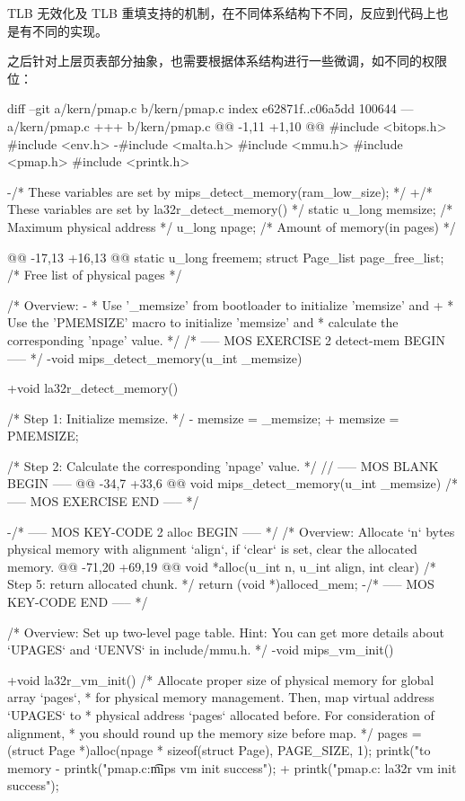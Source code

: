 TLB 无效化及 TLB 重填支持的机制，在不同体系结构下不同，反应到代码上也是有不同的实现。

之后针对上层页表部分抽象，也需要根据体系结构进行一些微调，如不同的权限位：

\begin{CodeBlock}[language=BookDiff]
diff --git a/kern/pmap.c b/kern/pmap.c
index e62871f..c06a5dd 100644
--- a/kern/pmap.c
+++ b/kern/pmap.c
@@ -1,11 +1,10 @@
 #include <bitops.h>
 #include <env.h>
-#include <malta.h>
 #include <mmu.h>
 #include <pmap.h>
 #include <printk.h>
 
-/* These variables are set by mips_detect_memory(ram_low_size); */
+/* These variables are set by la32r_detect_memory() */
 static u_long memsize; /* Maximum physical address */
 u_long npage;         /* Amount of memory(in pages) */
 
@@ -17,13 +16,13 @@ static u_long freemem;
 struct Page_list page_free_list; /* Free list of physical pages */
 
 /* Overview:
- *   Use '_memsize' from bootloader to initialize 'memsize' and
+ *   Use the 'PMEMSIZE' macro to initialize 'memsize' and
  *   calculate the corresponding 'npage' value.
  */
 /* ----- MOS EXERCISE 2 detect-mem BEGIN ----- */
-void mips_detect_memory(u_int _memsize) {
+void la32r_detect_memory() {
    /* Step 1: Initialize memsize. */
-   memsize = _memsize;
+   memsize = PMEMSIZE;
 
    /* Step 2: Calculate the corresponding 'npage' value. */
    // ----- MOS BLANK BEGIN -----
@@ -34,7 +33,6 @@ void mips_detect_memory(u_int _memsize) {
 }
 /* ----- MOS EXERCISE END ----- */
 
-/* ----- MOS KEY-CODE 2 alloc BEGIN ----- */
 /* Overview:
     Allocate `n` bytes physical memory with alignment `align`, if `clear` is set, clear the
     allocated memory.
@@ -71,20 +69,19 @@ void *alloc(u_int n, u_int align, int clear) {
    /* Step 5: return allocated chunk. */
    return (void *)alloced_mem;
 }
-/* ----- MOS KEY-CODE END ----- */
 
 /* Overview:
     Set up two-level page table.
    Hint:
     You can get more details about `UPAGES` and `UENVS` in include/mmu.h. */
-void mips_vm_init() {
+void la32r_vm_init() {
    /* Allocate proper size of physical memory for global array `pages`,
     * for physical memory management. Then, map virtual address `UPAGES` to
     * physical address `pages` allocated before. For consideration of alignment,
     * you should round up the memory size before map. */
    pages = (struct Page *)alloc(npage * sizeof(struct Page), PAGE_SIZE, 1);
    printk("to memory %
-   printk("pmap.c:\t mips vm init success\n");
+   printk("pmap.c: la32r vm init success\n");
 }
 
}}}
\end{CodeBlock}
